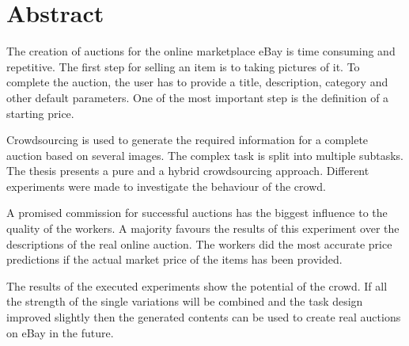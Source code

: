 \chapter*{Abstract}
\thispagestyle{empty}
The creation of auctions for the online marketplace eBay is time consuming and repetitive. The first step for selling an item is to taking pictures of it. To complete the auction, the user has to provide a title, description, category and other default parameters. One of the most important step is the definition of a starting price.

Crowdsourcing is used to generate the required information for a complete auction based on several images. The complex task is split into multiple subtasks. The thesis presents a pure and a hybrid crowdsourcing approach. Different experiments were made to investigate the behaviour of the crowd.

A promised commission for successful auctions has the biggest influence to the quality of the workers. A majority favours the results of this experiment over the descriptions of the real online auction. The workers did the most accurate price predictions if the actual market price of the items has been provided.
  
The results of the executed experiments show the potential of the crowd. If all the strength of the single variations will be combined and the task design improved slightly then the generated contents can be used to create real auctions on eBay in the future.
\clearpage
